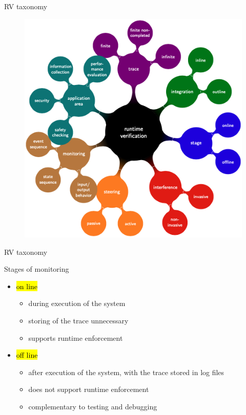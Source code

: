\documentclass[10pt,usenames,dvipsnames]{beamer}
\begin{document}
\begin{frame}{RV taxonomy}
    \begin{figure}
        \centering
        \includegraphics[width=0.59\linewidth]{images/example6.png}
    \end{figure}
\end{frame}

\begin{frame}{RV taxonomy}
  \begin{block}{Stages of monitoring}
    \begin{itemize}
    \item \hl{on line}
      \begin{itemize}
      \item during execution of the system
      \item storing of the trace unnecessary
      \item      supports runtime enforcement
      \end{itemize}
    \item \hl{off line}
      \begin{itemize}
      \item  after execution of the system, with the trace stored in log files
      \item      does not support runtime enforcement
      \item complementary to testing and debugging
      \end{itemize}
    \end{itemize}
  \end{block}

\end{frame}
\end{document}
